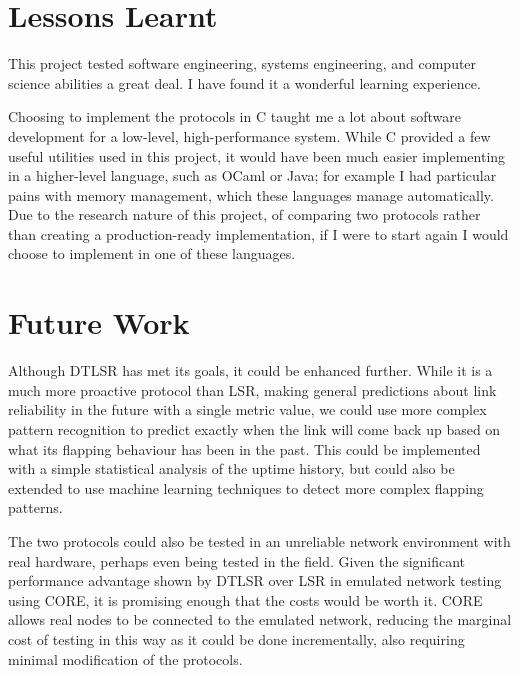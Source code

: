 \documentclass[withindex,glossary,openany]{cam-thesis}
\begin{document}
\section{Lessons Learnt}

This project tested software engineering, systems engineering, and computer science abilities a great deal. I have found it a wonderful learning experience.

Choosing to implement the protocols in C taught me a lot about software development for a low-level, high-performance system. While C provided a few useful utilities used in this project, it would have been much easier implementing in a higher-level language, such as OCaml or Java; for example I had particular pains with memory management, which these languages manage automatically. Due to the research nature of this project, of comparing two protocols rather than creating a production-ready implementation, if I were to start again I would choose to implement in one of these languages.

\section{Future Work}

Although DTLSR has met its goals, it could be enhanced further. While it is a much more proactive protocol than LSR, making general predictions about link reliability in the future with a single metric value, we could use more complex pattern recognition to predict exactly when the link will come back up based on what its flapping behaviour has been in the past. This could be implemented with a simple statistical analysis of the uptime history, but could also be extended to use machine learning techniques to detect more complex flapping patterns.

The two protocols could also be tested in an unreliable network environment with real hardware, perhaps even being tested in the field. Given the significant performance advantage shown by DTLSR over LSR in emulated network testing using CORE, it is promising enough that the costs would be worth it. CORE allows real nodes to be connected to the emulated network, reducing the marginal cost of testing in this way as it could be done incrementally, also requiring minimal modification of the protocols. \cite{einstein}











\end{document}

